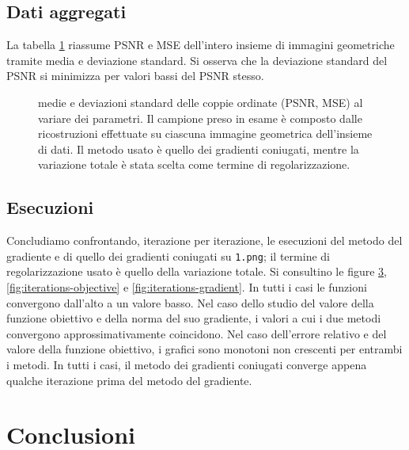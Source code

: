 \documentclass[a4paper]{article}
\begin{document}
\subsection{Dati aggregati}
La tabella \ref{fig:aggregation} riassume PSNR e MSE dell'intero insieme di
immagini geometriche tramite media e deviazione standard.
Si osserva che la deviazione standard del PSNR si minimizza per valori bassi del
PSNR stesso.
\begin{figure}[H]
  \begin{center}
    \scalebox{0.65}{}
  \end{center}
  \caption{medie e deviazioni standard delle coppie ordinate (PSNR, MSE) al
  variare dei parametri. Il campione preso in esame è composto dalle
  ricostruzioni effettuate su ciascuna immagine geometrica dell'insieme di
  dati. Il metodo usato è quello dei gradienti coniugati, mentre la variazione
  totale è stata scelta come termine di regolarizzazione.}
  \label{fig:aggregation}
\end{figure}

\subsection{Esecuzioni}
Concludiamo confrontando, iterazione per iterazione, le esecuzioni del metodo
del gradiente e di quello dei gradienti coniugati su \verb!1.png!; il termine di
regolarizzazione usato è quello della variazione totale. Si consultino le figure
\ref{fig:iterations-error}, \ref{fig:iterations-objective} e
\ref{fig:iterations-gradient}. In tutti i casi le funzioni convergono dall'alto
a un valore basso. Nel caso dello studio del valore della funzione obiettivo e
della norma del suo gradiente, i valori a cui i due metodi convergono
approssimativamente coincidono. Nel caso dell'errore relativo e del valore della
funzione obiettivo, i grafici sono monotoni non crescenti per entrambi i metodi.
In tutti i casi, il metodo dei gradienti coniugati converge appena qualche
iterazione prima del metodo del gradiente.
\begin{figure}[H]
    \centering
    \begin{subfigure}{.3\textwidth}
      \centering
      \scalebox{.65}{!}{}
      \label{fig:iterations-error}
    \end{subfigure}
\end{figure}

\section{Conclusioni}
\end{document}
